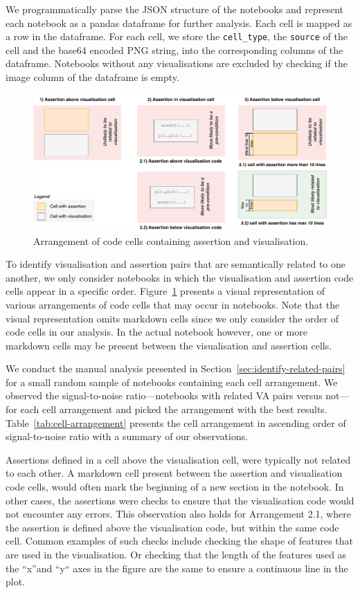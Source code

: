 \documentclass[conference]{IEEEtran}
\begin{document}
We programmatically parse the JSON structure of the notebooks and represent each notebook as a pandas dataframe for further analysis. Each cell is mapped as a row in the dataframe. For each cell, we store the \texttt{cell\_type}, the \texttt{source} of the cell and the base64 encoded PNG string, into the corresponding columns of the dataframe. Notebooks without any visualisations are excluded by checking if the image column of the dataframe is empty.

\begin{figure}
  \centering
  \includegraphics[width=\linewidth]{nb-structure.pdf}
  \caption{Arrangement of code cells containing assertion and
    visualisation.}\label{fig:cell-arrangement}
\end{figure}

To identify visualisation and assertion pairs that are semantically related to one another, we only consider notebooks in which the visualisation and assertion code cells appear in a specific order. Figure~\ref{fig:cell-arrangement} presents a visual representation of various arrangements of code cells that may occur in notebooks. Note that the visual representation omits markdown cells since we only consider the order of code cells in our analysis. In the actual notebook however, one or more markdown cells may be present between the visualisation and assertion cells.

We conduct the manual analysis presented in Section~\ref{sec:identify-related-pairs} for a small random sample of notebooks containing each cell arrangement. We observed the signal-to-noise ratio---notebooks with related VA pairs versus not---for each cell arrangement and picked the arrangement with the best results. Table~\ref{tab:cell-arrangement} presents the cell arrangement in ascending order of signal-to-noise ratio with a summary of our observations.

Assertions defined in a cell above the visualisation cell, were typically not related to each other. A markdown cell present between the assertion and visualisation code cells, would often mark the beginning of a new section in the notebook. In other cases, the assertions were checks to ensure that the visualisation code would not encounter any errors. This observation also holds for Arrangement 2.1, where the assertion is defined above the visualisation code, but within the same code cell. Common examples of such checks include checking the shape of features that are used in the visualisation. Or checking that the length of the features used as the ``x''and ``y`` axes in the figure are the same to ensure a continuous line in the plot.
\end{document}
